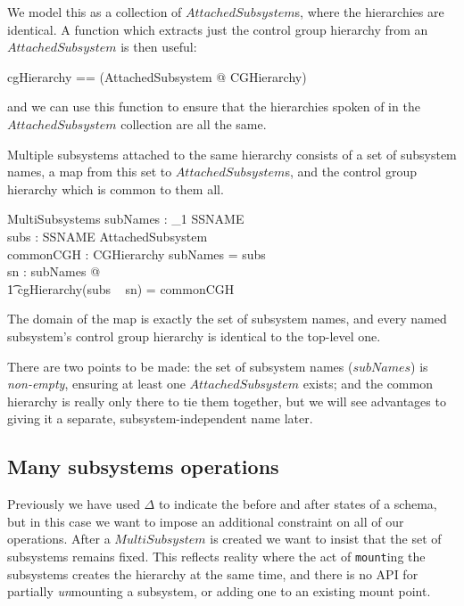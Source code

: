 \documentclass[a4paper,twoside,12pt]{article}
\begin{document}
We model this as a collection of $AttachedSubsystem$s, where the hierarchies are identical.
A function which extracts just the control group hierarchy from an $AttachedSubsystem$ is then useful:
\begin{zed}
cgHierarchy == (\lambda AttachedSubsystem @ \theta CGHierarchy)
\end{zed}
and we can use this  function to ensure that the hierarchies spoken of in the $AttachedSubsystem$
collection are all the same.

Multiple subsystems attached to the same hierarchy consists of a set of subsystem names, a map from this set
to $AttachedSubsystem$s, and the control group hierarchy which is common to them all.
\begin{schema}{MultiSubsystems}
subNames : \finset_1 SSNAME \\
subs : SSNAME \ffun AttachedSubsystem \\
commonCGH : CGHierarchy
\where
subNames = \dom subs \\
\forall sn : subNames @ \\
    \t1 cgHierarchy(subs ~ sn) = commonCGH
\end{schema}
The domain of the map is exactly the set of subsystem names, and every named subsystem's
control group hierarchy is identical to the top-level one.

There are two points to be made: the set of subsystem names ($subNames$) is \emph{non-empty}, ensuring at least
one $AttachedSubsystem$ exists; and the common hierarchy is really only there to tie them together, but
we will see advantages to giving it a separate, subsystem-independent name later.

\subsection{Many subsystems operations}

Previously we have used $\Delta$ to indicate the before and after states of a schema, but in this case we want to
impose an additional constraint on all of our operations. After a $MultiSubsystem$ is created we want to insist that
the set of subsystems remains fixed. This reflects reality where the act of \texttt{mount}ing the subsystems creates the
hierarchy at the same time, and there is no API for partially \emph{un}mounting a subsystem, or adding one to an existing mount point.
\end{document}
